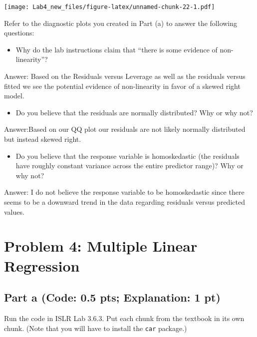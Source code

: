 \documentclass[
]{article}
\providecommand{\tightlist}{%
  \setlength{\itemsep}{0pt}\setlength{\parskip}{0pt}}
\begin{document}
\texttt{[image: Lab4\_new\_files/figure-latex/unnamed-chunk-22-1.pdf]}

Refer to the diagnostic plots you created in Part (a) to answer the
following questions:

\begin{itemize}
\tightlist
\item
  Why do the lab instructions claim that ``there is some evidence of
  non-linearity''?
\end{itemize}

Answer: Based on the Residuals versus Leverage as well as the residuals
versus fitted we see the potential evidence of non-linearity in favor of
a skewed right model.

\begin{itemize}
\tightlist
\item
  Do you believe that the residuals are normally distributed? Why or why
  not?
\end{itemize}

Answer:Based on our QQ plot our residuals are not likely normally
distributed but instead skewed right.

\begin{itemize}
\tightlist
\item
  Do you believe that the response variable is homoskedastic (the
  residuals have roughly constant variance across the entire predictor
  range)? Why or why not?
\end{itemize}

Answer: I do not believe the response variable to be homoskedastic since
there seems to be a downward trend in the data regarding residuals
versus predicted values.

\hypertarget{problem-4-multiple-linear-regression}{%
\section{Problem 4: Multiple Linear
Regression}\label{problem-4-multiple-linear-regression}}

\hypertarget{part-a-code-0.5-pts-explanation-1-pt-1}{%
\subsection{Part a (Code: 0.5 pts; Explanation: 1
pt)}\label{part-a-code-0.5-pts-explanation-1-pt-1}}

Run the code in ISLR Lab 3.6.3. Put each chunk from the textbook in its
own chunk. (Note that you will have to install the \texttt{car}
package.)
\end{document}
